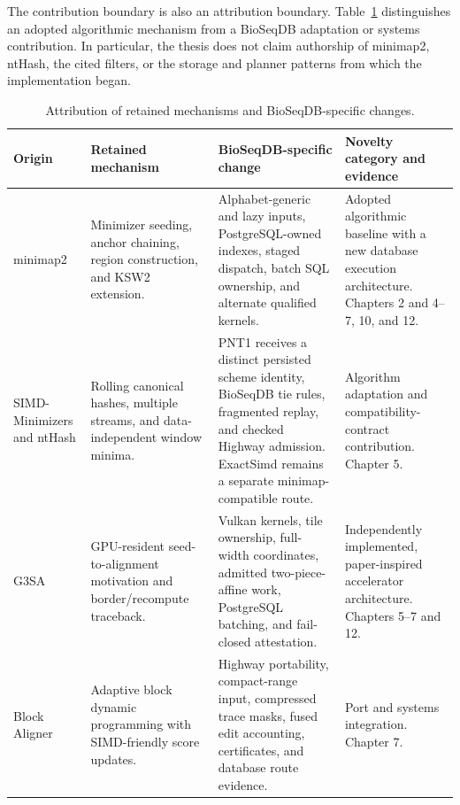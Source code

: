 The contribution boundary is also an attribution boundary.
Table~\ref{tab:solution-attribution} distinguishes an adopted algorithmic
mechanism from a BioSeqDB adaptation or systems contribution.  In particular,
the thesis does not claim authorship of minimap2, ntHash, the cited filters,
or the storage and planner patterns from which the implementation began.

\begin{table}[p]
  \centering
  \scriptsize
  \setlength{\tabcolsep}{3pt}
  \renewcommand{\arraystretch}{0.96}
  \caption{Attribution of retained mechanisms and BioSeqDB-specific changes.}
  \label{tab:solution-attribution}
  \begin{tabularx}{\linewidth}{p{.19\linewidth}p{.20\linewidth}
                               p{.29\linewidth}X}
    \toprule
    Origin & Retained mechanism & BioSeqDB-specific change &
    Novelty category and evidence \\
    \midrule
    minimap2~\cite{minimap2_paper,minimap2_software} &
    Minimizer seeding, anchor chaining, region construction, and KSW2
    extension. &
    Alphabet-generic and lazy inputs, PostgreSQL-owned indexes, staged
    dispatch, batch SQL ownership, and alternate qualified kernels. &
    Adopted algorithmic baseline with a new database execution
    architecture. Chapters 2 and 4--7, 10, and 12. \\
    SIMD-Minimizers and ntHash
    \cite{groot_koerkamp_simd_minimizers_2025,nthash_2016} &
    Rolling canonical hashes, multiple streams, and data-independent window
    minima. &
    PNT1 receives a distinct persisted scheme identity, BioSeqDB tie rules,
    fragmented replay, and checked Highway admission. ExactSimd remains a
    separate minimap-compatible route. &
    Algorithm adaptation and compatibility-contract contribution.
    Chapter 5. \\
    G3SA~\cite{g3sa_paper} &
    GPU-resident seed-to-alignment motivation and border/recompute traceback. &
    Vulkan kernels, tile ownership, full-width coordinates, admitted
    two-piece-affine work, PostgreSQL batching, and fail-closed attestation. &
    Independently implemented, paper-inspired accelerator architecture.
    Chapters 5--7 and 12. \\
    Block Aligner~\cite{block_aligner_paper} &
    Adaptive block dynamic programming with SIMD-friendly score updates. &
    Highway portability, compact-range input, compressed trace masks, fused
    edit accounting, certificates, and database route evidence. &
    Port and systems integration. Chapter 7. \\
    \bottomrule
  \end{tabularx}
\end{table}


